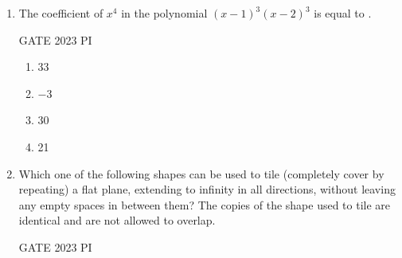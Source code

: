 \documentclass[journal,12pt,onecolumn]{IEEEtran}
\theoremstyle{remark}
\begin{document}
\begin{enumerate}
Based only on the above passage, which one of the following statements can be inferred with certainty?

\hfill{GATE 2023 PI}

\begin{multicols}{2}
\begin{enumerate}
    \item According to the World Bank, the root cause of Sri Lanka's economic crisis is that it does not have enough foreign exchange.
    \item The World Bank has stated that it will advise the Sri Lankan government about how to tackle the root causes of its economic crisis.
    \item According to the World Bank, Sri Lanka does not yet have an adequate macroeconomic policy framework.
    \item The World Bank has stated that it will provide Sri Lanka with additional funds for essentials such as food, fuel, and medicines.
\end{enumerate}
\end{multicols}

\item The coefficient of \(x^4\) in the polynomial \((x-1)^3(x-2)^3\) is equal to \underline{\hspace{2cm}}.

\hfill{GATE 2023 PI}

\begin{multicols}{2}
\begin{enumerate}
    \item 33
    \item $-3$
    \item 30
    \item 21
\end{enumerate}
\end{multicols}
\item Which one of the following shapes can be used to tile (completely cover by repeating) a flat plane, extending to infinity in all directions, without leaving any empty spaces in between them? The copies of the shape used to tile are identical and are not allowed to overlap.

\hfill{GATE 2023 PI}


\end{enumerate}
\end{document}
